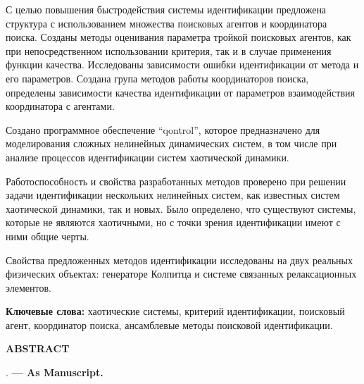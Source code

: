 \documentclass[a4paper,13pt]{atuaref}
\newcommand{\xsect}[1]{\vspace{0.15ex}\begin{center}\textbf{#1}\end{center}\vspace{4pt}\penalty10000}
\begin{document}
С целью повышения быстродействия системы идентификации предложена структура с
использованием множества поисковых агентов и координатора поиска.
Созданы методы оценивания параметра тройкой поисковых агентов, как при непосредственном
использовании критерия, так и в случае применения функции качества. Исследованы
зависимости ошибки идентификации от метода и его параметров. Создана
група методов работы координаторов поиска, определены зависимости качества
идентификации от параметров взаимодействия координатора с агентами.

Создано программное обеспечение ``qontrol'', которое предназначено для
моделирования сложных нелинейных динамических систем, в том числе при анализе
процессов идентификации систем хаотической динамики.

Работоспособность и свойства разработанных методов проверено при решении задачи
идентификации нескольких нелинейных систем, как известных систем хаотической
динамики, так и новых. Было определено, что существуют системы, которые не
являются хаотичными, но с точки зрения идентификации имеют с ними общие черты.

Свойства предложенных методов идентификации исследованы на двух реальных
физических объектах: генераторе Колпитца и системе связанных релаксационных элементов.


\textbf{Ключевые слова:}
хаотические системы,
критерий идентификации,
поисковый агент,
координатор поиска,
ансамблевые методы поисковой идентификации.


\xsect{ABSTRACT}

\textbf{\dissauthorEn}
\textbf{\booknameEn}.
\textbf{--- As Manuscript.}
\end{document}
